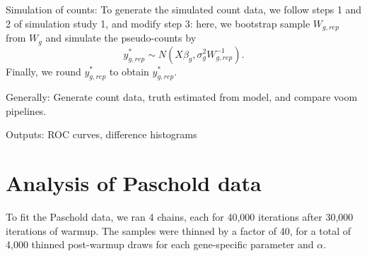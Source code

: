 Simulation of counts:
To generate the simulated count data, we follow steps 1 and 2 of simulation study 1, and modify step 3: here, we bootstrap sample $W_{g,rep}$ from $W_g$ and simulate the pseudo-counts by
$$y^*_{g,rep} \sim N(X\beta_g,\sigma^2_gW_{g,rep}^{-1}).$$
Finally, we round $y^*_{g,rep}$ to obtain $y^*_{g,rep}$.




Generally: Generate count data, truth estimated from model, and compare voom pipelines.

Outputs: ROC curves, difference histograms

\section{Analysis of Paschold data}
To fit the Paschold data, we ran 4 chains, each for 40,000 iterations after 30,000 iterations of warmup. The samples were thinned by a factor of 40, for a total of 4,000 thinned post-warmup draws for each gene-specific parameter and $\alpha$. 




